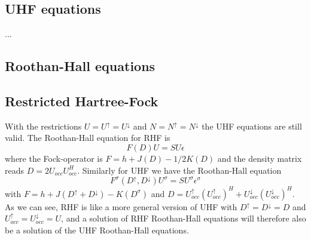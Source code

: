 \documentclass[norsk,a4paper,12pt]{article}
\begin{document}
\subsection{UHF equations}
...

\subsection{Roothan-Hall equations}
\subsection{Restricted Hartree-Fock}
With the restrictions $U=U^{\uparrow}=U^{\downarrow}$ and $N=N^{\uparrow}=N^{\downarrow}$ the UHF equations are still valid. The Roothan-Hall equation for RHF is
\begin{equation}
F(D)U=SU\epsilon
\end{equation}
where the Fock-operator is $F=h+J(D)-1/2K(D)$ and the density matrix reads $D=2U_{occ}U_{occ}^H$.
Similarly for UHF we have the Roothan-Hall equation
\begin{equation}
F^{\sigma}(D^{\uparrow},D^{\downarrow})U^{\sigma}=SU^{\sigma}\epsilon^{\sigma}
\end{equation}
with $F=h+J(D^{\uparrow}+D^{\downarrow})-K(D^{\sigma})$ and $D=U_{occ}^{\uparrow}(U_{occ}^{\uparrow})^H+U_{occ}^{\downarrow}(U_{occ}^{\downarrow})^H$. As we can see, RHF is like a more general version of UHF with $D^{\uparrow}=D^{\downarrow}=D$ and $U_{occ}^{\uparrow}=U_{occ}^{\downarrow}=U$, and a solution of RHF Roothan-Hall equations will therefore also be a solution of the UHF Roothan-Hall equations. 

\end{document}
